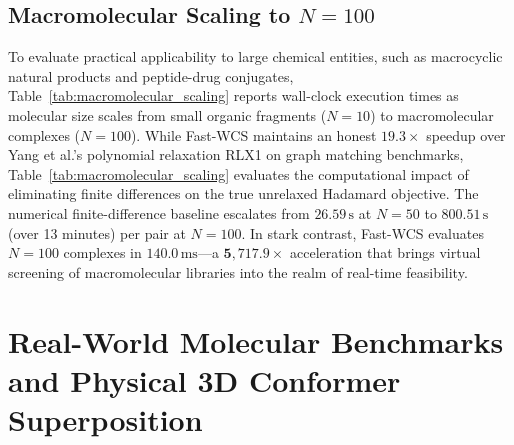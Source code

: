 \documentclass[conference]{IEEEtran}
\begin{document}
\subsection{Macromolecular Scaling to $N = 100$}

To evaluate practical applicability to large chemical entities, such as macrocyclic natural products and peptide-drug conjugates, Table~\ref{tab:macromolecular_scaling} reports wall-clock execution times as molecular size scales from small organic fragments ($N = 10$) to macromolecular complexes ($N = 100$). While Fast-WCS maintains an honest $19.3\times$ speedup over Yang et al.'s polynomial relaxation RLX1 on graph matching benchmarks, Table~\ref{tab:macromolecular_scaling} evaluates the computational impact of eliminating finite differences on the true unrelaxed Hadamard objective. The numerical finite-difference baseline escalates from $26.59\,\text{s}$ at $N = 50$ to $800.51\,\text{s}$ (over 13 minutes) per pair at $N = 100$. In stark contrast, Fast-WCS evaluates $N = 100$ complexes in $140.0\,\text{ms}$---a $\mathbf{5,717.9\times}$ acceleration that brings virtual screening of macromolecular libraries into the realm of real-time feasibility.



\section{Real-World Molecular Benchmarks and Physical 3D Conformer Superposition}
\label{sec:screening_benchmark}
\end{document}

